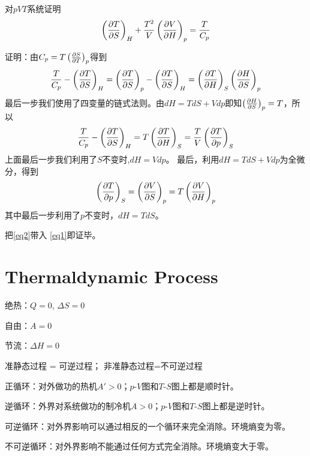 \documentclass[CJK]{beamer}
\begin{document}
\begin{frame}
  \bch
  对$pVT$系统证明
  $$\left(\frac{\partial T}{\partial S}\right)_{H} +\frac{T^2}{V} \left(\frac{\partial V}{\partial H}\right)_{p} = \frac{T}{C_p} $$
  \ech
\end{frame}

\begin{frame}
  \bch
  {\scriptsize
  证明：由$C_p = T\left(\frac{\partial S}{\partial T}\right)_{p}$得到
  $$ \frac{T}{C_p} - \left(\frac{\partial T}{\partial S}\right)_{H} = \left(\frac{\partial T}{\partial S}\right)_{p} - \left(\frac{\partial T}{\partial S}\right)_{H} = \left(\frac{\partial T}{\partial H}\right)_{S} \left(\frac{\partial H}{\partial S}\right)_{p} $$
  最后一步我们使用了四变量的链式法则。由$dH = TdS + Vdp$即知$\left(\frac{\partial H}{\partial S}\right)_{p} = T$，所以
  \begin{equation}
    \frac{T}{C_p} - \left(\frac{\partial T}{\partial S}\right)_{H} = T \left(\frac{\partial T}{\partial H}\right)_{S} = \frac{T}{V} \left(\frac{\partial T}{\partial p}\right)_{S} \label{eq1}
  \end{equation}
  上面最后一步我们利用了$S$不变时,$ dH = Vdp$。
  最后，利用$dH  = TdS +Vdp$为全微分，得到
  \begin{equation}
    \left(\frac{\partial T}{\partial p}\right)_{S} = \left(\frac{\partial V}{\partial S}\right)_{p} = T\left(\frac{\partial V}{\partial H}\right)_{p} \label{eq2}
  \end{equation}
  其中最后一步利用了$p$不变时，$dH = TdS$。

  把\eqref{eq2}带入 \eqref{eq1}即证毕。
  
  }
  \ech
\end{frame}

\section{Thermaldynamic Process}

\begin{frame}
\end{frame}

\begin{frame}
  \bch
  \bitem
\item{绝热：$Q  = 0$,  $\Delta S = 0$}
\item{自由：$A=0$}
\item{节流：$\Delta H = 0$}
\item{准静态过程 = 可逆过程； 非准静态过程=不可逆过程}
\item{正循环：对外做功的热机$A'>0$；$p$-$V$图和$T$-$S$图上都是顺时针。}
\item{逆循环：外界对系统做功的制冷机$A>0$；$p$-$V$图和$T$-$S$图上都是逆时针。}
\item{可逆循环：对外界影响可以通过相反的一个循环来完全消除。环境熵变为零。}
\item{不可逆循环：对外界影响不能通过任何方式完全消除。环境熵变大于零。}
\eitem
  \ech  
\end{frame}
\end{document}
